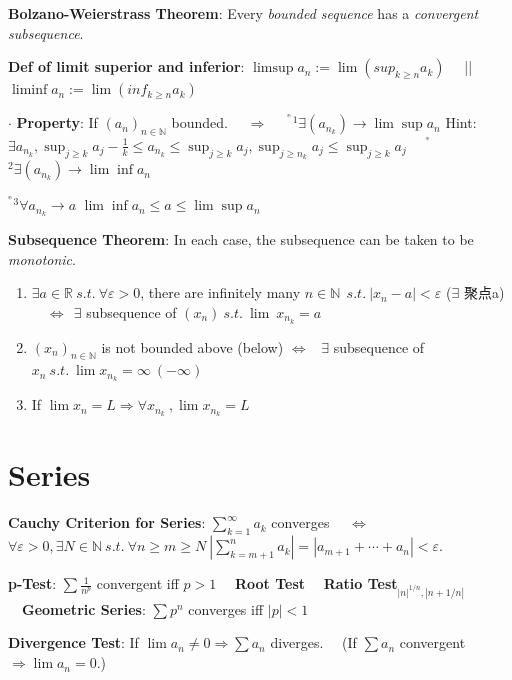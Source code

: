 \documentclass[9pt]{article}
\newcommand{\ex}{{\tiny $^{^{^\oplus}}$}}
\begin{document}
\textbf{Bolzano-Weierstrass Theorem}: Every \textit{bounded sequence} has a \textit{convergent subsequence}.

\textbf{Def of limit superior and inferior}: $\limsup a_n:=\lim(sup_{k\geq n}a_k)$ \ \ || \ \ $\liminf a_n:=\lim(inf_{k\geq n}a_k)$

$\cdot$ \textbf{Property}: If $(a_n)_{n\in\mathbb{N}}$ bounded. \ \ $\Rightarrow$ \ \ \ex$^1\exists (a_{n_k})\to\lim\sup a_n$ {\tiny Hint:$\exists a_{n_k},\sup_{j\geq k}a_j-\frac{1}{k}\leq a_{n_k}\leq\sup_{j\geq k}a_j,\sup_{j\geq n_k}a_j\leq\sup_{j\geq k}a_j$} \ \ \ex$^2\exists (a_{n_k})\to\lim\inf a_n$

\hspace{157pt} \ex $^3\forall a_{n_k}\to a$ $\lim\inf a_n\leq a\leq\lim\sup a_n$

\textbf{Subsequence Theorem}: In each case, the subsequence can be taken to be \textit{monotonic}.
\begin{enumerate}[itemsep=-2pt, topsep=-2pt]
    \item $\exists a \in \mathbb{R} \ s.t. \ \forall \varepsilon > 0$, there are infinitely many $n \in \mathbb{N} \ \ s.t. \ |x_n - a|<\varepsilon$ {\footnotesize ($\exists$ 聚点a)} \ \ $\Leftrightarrow \ \ \exists$ subsequence of $(x_n) \ s.t. \ \lim\ x_{n_k}=a$
    \item $(x_n)_{n \in \mathbb{N}}$ is not bounded above (below) $\Leftrightarrow$ \ $\exists$ subsequence of $x_n \ s.t. \ \lim x_{n_k}=\infty \ (-\infty)$
    \item If $\lim x_n=L \Rightarrow \forall x_{n_k} \ , \lim x_{n_k}=L$
\end{enumerate}


\section{Series}

\textbf{Cauchy Criterion for Series}: $\sum^\infty_{k=1}a_k$ converges \ \ $\Leftrightarrow$ \ \ $\forall\varepsilon>0,\exists N\in\mathbb{N} \ s.t. \ \forall n\geq m\geq N \ |\sum^{n}_{k=m+1}a_k|=|a_{m+1}+\cdots+a_n|<\varepsilon$.

\textbf{p-Test}: $\sum \frac{1}{n^p}$ convergent iff $p>1$ \ \ \textbf{Root Test} \ \ \textbf{Ratio Test}$_{|n|^{1/n},|n+1/n|}$ \ \ \textbf{Geometric Series}: $\sum p^n$ converges iff $|p|<1$

\textbf{Divergence Test}: If $\lim a_n\ne 0 \Rightarrow \sum a_n$ diverges. \ \ (If $\sum a_n$ convergent $\Rightarrow \lim a_n=0.$)
\end{document}
